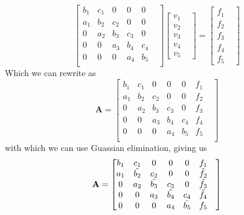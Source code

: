 \documentclass{article}
\begin{document}
\[
\begin{bmatrix}
                           b_1& c_1& 0& 0& 0& \\
                           a_1& b_2& c_2& 0& 0& \\
                           0& a_2& b_3& c_3& 0& \\
                           0& 0& a_3& b_4& c_4& \\
                           0& 0& 0& a_4& b_5& \\
\end{bmatrix}
\begin{bmatrix}
                           v_1&\\
                           v_2&\\
                           v_3&\\
                           v_4&\\
                           v_5&
\end{bmatrix}=
\begin{bmatrix}
                           f_1&\\
                           f_2&\\
                           f_3&\\
                           f_4&\\
                           f_5&
\end{bmatrix}
\]
\break
Which we can rewrite as
\[
\mathbf{A}=\begin{bmatrix}
                           b_1& c_1& 0& 0& 0& f_1&\\
                           a_1& b_2& c_2& 0& 0& f_2&\\
                           0& a_2& b_3& c_3& 0& f_3&\\
                           0& 0& a_3& b_4& c_4& f_4&\\
                           0& 0& 0& a_4& b_5& f_5&\\
\end{bmatrix}
\]
\break
with which we can use Guassian elimination, giving us
\[
\mathbf{A}=\begin{bmatrix}
                           b_1& c_1& 0& 0& 0& f_1&\\
                           a_1& \Tilde{b_2}& c_2& 0& 0& \Tilde{f_2}&\\
                           0& a_2& \Tilde{b_3}& c_3& 0& \Tilde{f_3}&\\
                           0& 0& a_3& \Tilde{b_4}& c_4& \Tilde{f_4}&\\
                           0& 0& 0& a_4& \Tilde{b_5}& f_5&\\
\end{bmatrix}
\]
\end{document}
